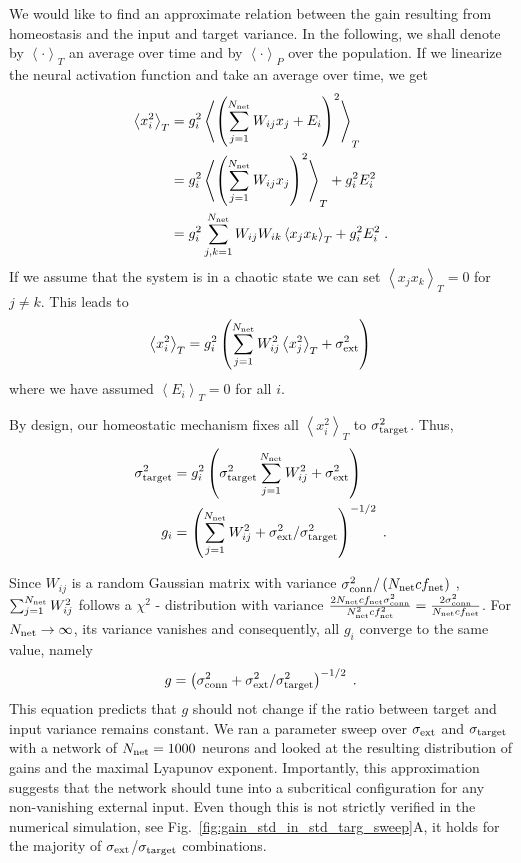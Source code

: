 \documentclass[10pt,a4paper]{article}
\newcommand{\avgt}[1]{\left< #1 \right>_T}
\newcommand{\avgp}[1]{\left< #1 \right>_P}
\begin{document}
We would like to find an approximate relation between the gain resulting from homeostasis and the input and target variance. In the following, we shall denote by $\avgt{\cdot}$ an average over time and by $\avgp{\cdot}$ over the population. If we linearize the neural activation function and take an average over time, we get
\begin{align}
	\avgt{x_i^2} &= g_i^2 \avgt{\left(\sum_{j=1}^{N_{\rm net}} W_{ij} x_j + E_i\right)^2} \label{eq:time_avg_act_var}\\
	&= g_i^2 \avgt{\left( \sum_{j=1}^{N_{\rm net}} W_{ij} x_j \right)^2} + g_i^2 E_i^2 \\
	&= g_i^2 \sum_{j,k=1}^{N_{\rm net}} W_{ij}W_{ik} \avgt{x_j x_k} + g_i^2 E_i^2 \; .
\end{align}
If we assume that the system is in a chaotic state we can set $\avgt{x_j x_k}=0$ for $j\neq k$. This leads to
\begin{equation}
	\avgt{x_i^2} = g_i^2 \left( \sum_{j=1}^{N_{\rm net}} W_{ij}^2 \avgt{x_j^2} + \sigma_{\rm ext}^2 \right)
\end{equation}
where we have assumed $\avgt{E_i} = 0$ for all $i$.

By design, our homeostatic mechanism fixes all $\avgt{x_i^2}$ to $\sigma_{\rm target}^2$. Thus,
\begin{align}
	\sigma_{\rm target}^2 &= g_i^2 \left( \sigma_{\rm target}^2 \sum_{j=1}^{N_{\rm net}} W_{ij}^2 + \sigma_{\rm ext}^2 \right) \\ 
	g_i &= \left(\sum_{j=1}^{N_{\rm net}} W_{ij}^2 + \sigma_{\rm ext}^2 / \sigma_{\rm target}^2\right)^{-1/2} \; .
\end{align}

Since $W_{ij}$ is a random Gaussian matrix with variance $\sigma_{\rm conn}^2/\left( N_{\rm net} cf_{\rm net} \right)$ , $\sum_{j=1}^{N_{\rm net}} W_{ij}^2$ follows a $\chi^2$ - distribution with variance $\frac{2N_{\rm net} cf_{\rm net} \sigma_{\rm conn}^2}{N_{\rm net}^2 cf_{\rm net}^2} = \frac{2 \sigma_{\rm conn}^2}{N_{\rm net} cf_{\rm net}}$. For $N_{\rm net} \rightarrow \infty $, its variance vanishes and consequently, all $g_i$ converge to the same value, namely 
\begin{equation}
	g = \left(\sigma_{\rm conn}^2 + \sigma_{\rm ext}^2 / \sigma_{\rm target}^2\right)^{-1/2} \; . \label{eq:gain_pred}
\end{equation}
This equation predicts that $g$ should not change if the ratio between target and input variance remains constant. We ran a parameter sweep over $\sigma_{\rm ext}$ and $\sigma_{\rm target}$ with a network of $N_{\rm net} = 1000$ neurons and looked at the resulting distribution of gains and the maximal Lyapunov exponent. Importantly, this approximation suggests that the network should tune into a subcritical configuration for any non-vanishing external input. Even though this is not strictly verified in the numerical simulation, see Fig.~\ref{fig:gain_std_in_std_targ_sweep}A, it holds for the majority of $ \sigma_{\rm ext}$/$\sigma_{\rm target}$ combinations.
\end{document}
